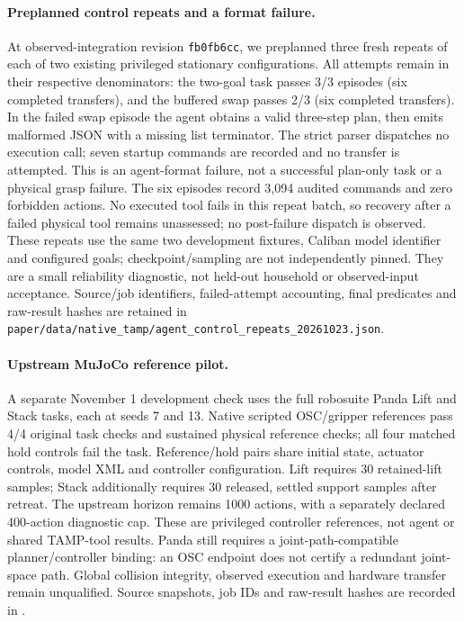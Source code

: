 \paragraph{Preplanned control repeats and a format failure.}
At observed-integration revision \texttt{fb0fb6cc}, we preplanned three fresh
repeats of each of two existing privileged stationary configurations. All
attempts remain in their respective denominators: the two-goal task passes
3/3 episodes (six completed transfers), and the buffered swap passes 2/3
(six completed transfers). In the failed swap episode the agent obtains a valid
three-step plan, then emits malformed JSON with a missing list terminator.
The strict parser dispatches no execution call; seven startup commands are
recorded and no transfer is attempted. This is an agent-format failure, not a
successful plan-only task or a physical grasp failure. The six episodes record
3,094 audited commands and zero forbidden actions. No executed tool fails in
this repeat batch, so recovery after a failed physical tool remains unassessed;
no post-failure dispatch is observed. These repeats use the same two development fixtures, Caliban model
identifier and configured goals; checkpoint/sampling are not independently
pinned. They are a small reliability diagnostic, not held-out household or
observed-input acceptance. Source/job identifiers, failed-attempt accounting,
final predicates and raw-result hashes are retained in
\texttt{paper/data/native\_tamp/agent\_control\_repeats\_20261023.json}.

\paragraph{Upstream MuJoCo reference pilot.}
A separate November 1 development check uses the full robosuite Panda Lift and
Stack tasks, each at seeds 7 and 13. Native scripted OSC/gripper references pass
4/4 original task checks and sustained physical reference checks; all four
matched hold controls fail the task. Reference/hold pairs share initial state,
actuator controls, model XML and controller configuration. Lift requires
30 retained-lift samples; Stack additionally requires 30 released, settled
support samples after retreat. The upstream horizon remains 1000 actions, with
a separately declared 400-action diagnostic cap. These are privileged controller
references, not agent or shared TAMP-tool results. Panda still requires a
joint-path-compatible planner/controller binding: an OSC endpoint does not
certify a redundant joint-space path. Global collision integrity, observed
execution and hardware transfer remain unqualified. Source snapshots, job IDs
and raw-result hashes are recorded in
.

